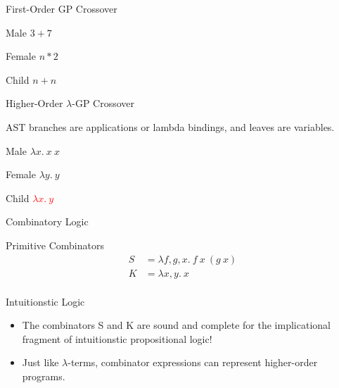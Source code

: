 \documentclass[mathserif]{beamer}
\newcommand{\diff}[1]{\textcolor{red}{#1}}
\begin{document}
\begin{frame}{First-Order GP Crossover}

\begin{block}{Male}
$3 + 7$
\end{block}

\begin{block}{Female}
$n * 2$
\end{block}

\begin{block}{Child}
$n + n$
\end{block}

\end{frame}

\begin{frame}{Higher-Order $\lambda$-GP Crossover}

AST branches are applications or lambda bindings, and leaves are
variables.

\begin{block}{Male}
$\lambda x. ~ x ~ x$
\end{block}

\begin{block}{Female}
$\lambda y. ~ y$
\end{block}

\begin{block}{Child}
\diff{$\lambda x. ~ y$}
\end{block}

\end{frame}

\begin{frame}{Combinatory Logic}
\begin{block}{Primitive Combinators}
\begin{align*}
S &= \lambda f,g,x . ~ f ~ x ~ (g ~ x)\\
K &= \lambda x,y . ~ x\\
\end{align*}
\end{block}

\begin{block}{Intuitionstic Logic}
\begin{itemize}
\item
The combinators S and K are sound and complete for the implicational
fragment of intuitionstic propositional logic!
\item
Just like $\lambda$-terms, combinator expressions can represent
higher-order programs.
\end{itemize}
\end{block}

\end{frame}
\end{document}
